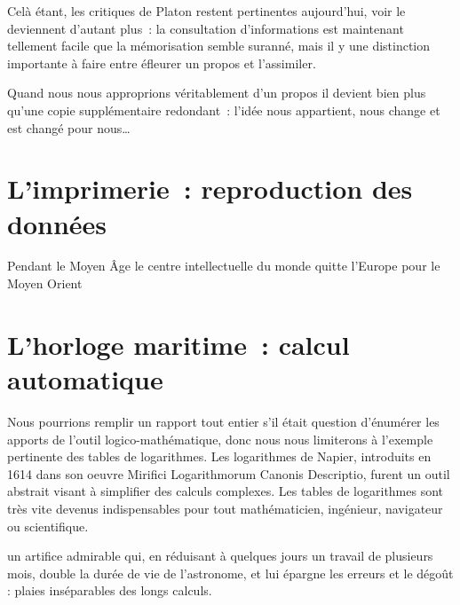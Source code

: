 Celà étant, les critiques de Platon restent pertinentes aujourd'hui, voir le deviennent d'autant plus~: la consultation d'informations est maintenant tellement facile que la mémorisation semble suranné, mais il y une distinction importante à faire entre éfleurer un propos et l'assimiler.

Quand nous nous approprions véritablement d'un propos il devient bien plus qu'une copie supplémentaire redondant~: l'idée nous appartient, nous change et est changé pour nous\ldots

\chapter{L'imprimerie~: reproduction des données}

Pendant le Moyen Âge le centre intellectuelle du monde quitte l'Europe pour le Moyen Orient


\chapter{L'horloge maritime~: calcul automatique}
Nous pourrions remplir un rapport tout entier s'il était question d'énumérer les apports de l'outil logico-mathématique, donc nous nous limiterons à l'exemple pertinente des tables de logarithmes. Les logarithmes de Napier, introduits en 1614 dans son oeuvre \og{}Mirifici Logarithmorum Canonis Descriptio\fg{}, furent un outil abstrait visant à simplifier des calculs complexes. Les tables de logarithmes sont très vite devenus indispensables pour tout mathématicien, ingénieur, navigateur ou scientifique.

\begin{coolquote} un artifice admirable qui, en réduisant à quelques jours un travail de plusieurs mois, double la durée de vie de l'astronome, et lui épargne les erreurs et le dégoût : plaies inséparables des longs calculs.
\end{coolquote}

